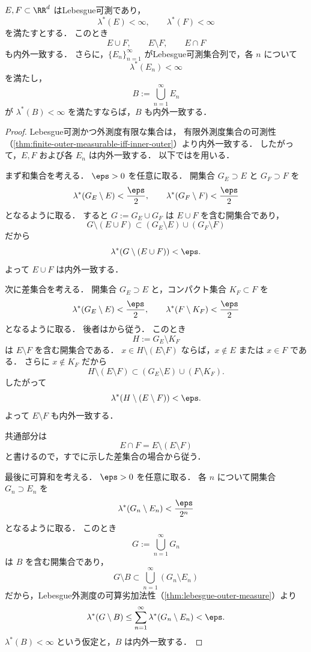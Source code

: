 \begin{lemma}[有限外測度での集合演算]\label{lem:finite-outer-measure-set-operations}
$E,F\subset\RR^d$ はLebesgue可測であり，
\[
\lambda^*(E)<\infty,\qquad \lambda^*(F)<\infty
\]
を満たすとする．
このとき
\[
E\cup F,\qquad E\setminus F,\qquad E\cap F
\]
も内外一致する．
さらに，$\{E_n\}_{n=1}^{\infty}$ がLebesgue可測集合列で，各 $n$ について
\[
\lambda^*(E_n)<\infty
\]
を満たし，
\[
B:=\bigcup_{n=1}^{\infty}E_n
\]
が $\lambda^*(B)<\infty$ を満たすならば，$B$ も内外一致する．
\end{lemma}
\begin{proof}
Lebesgue可測かつ外測度有限な集合は，
有限外測度集合の可測性（\cref{thm:finite-outer-measurable-iff-inner-outer}）より内外一致する．
したがって，$E,F$ および各 $E_n$ は内外一致する．
以下ではを用いる．

まず和集合を考える．
$\eps>0$ を任意に取る．
開集合 $G_E\supset E$ と $G_F\supset F$ を
\[
\lambda^*(G_E\setminus E)<\frac{\eps}{2},
\qquad
\lambda^*(G_F\setminus F)<\frac{\eps}{2}
\]
となるように取る．
すると $G:=G_E\cup G_F$ は $E\cup F$ を含む開集合であり，
\[
G\setminus(E\cup F)
\subset
(G_E\setminus E)\cup(G_F\setminus F)
\]
だから
\[
\lambda^*(G\setminus(E\cup F))<\eps.
\]
よって $E\cup F$ は内外一致する．

次に差集合を考える．
開集合 $G_E\supset E$ と，コンパクト集合 $K_F\subset F$ を
\[
\lambda^*(G_E\setminus E)<\frac{\eps}{2},
\qquad
\lambda^*(F\setminus K_F)<\frac{\eps}{2}
\]
となるように取る．
後者はから従う．
このとき
\[
H:=G_E\setminus K_F
\]
は $E\setminus F$ を含む開集合である．
$x\in H\setminus(E\setminus F)$ ならば，$x\notin E$ または $x\in F$ である．
さらに $x\notin K_F$ だから
\[
H\setminus(E\setminus F)
\subset
(G_E\setminus E)\cup(F\setminus K_F).
\]
したがって
\[
\lambda^*(H\setminus(E\setminus F))<\eps.
\]
よって $E\setminus F$ も内外一致する．

共通部分は
\[
E\cap F=E\setminus(E\setminus F)
\]
と書けるので，すでに示した差集合の場合から従う．

最後に可算和を考える．
$\eps>0$ を任意に取る．
各 $n$ について開集合 $G_n\supset E_n$ を
\[
\lambda^*(G_n\setminus E_n)<\frac{\eps}{2^n}
\]
となるように取る．
このとき
\[
G:=\bigcup_{n=1}^{\infty}G_n
\]
は $B$ を含む開集合であり，
\[
G\setminus B
\subset
\bigcup_{n=1}^{\infty}(G_n\setminus E_n)
\]
だから，Lebesgue外測度の可算劣加法性（\cref{thm:lebesgue-outer-measure}）より
\[
\lambda^*(G\setminus B)
\le
\sum_{n=1}^{\infty}\lambda^*(G_n\setminus E_n)
<\eps.
\]
$\lambda^*(B)<\infty$ という仮定と，$B$ は内外一致する．
\end{proof}

